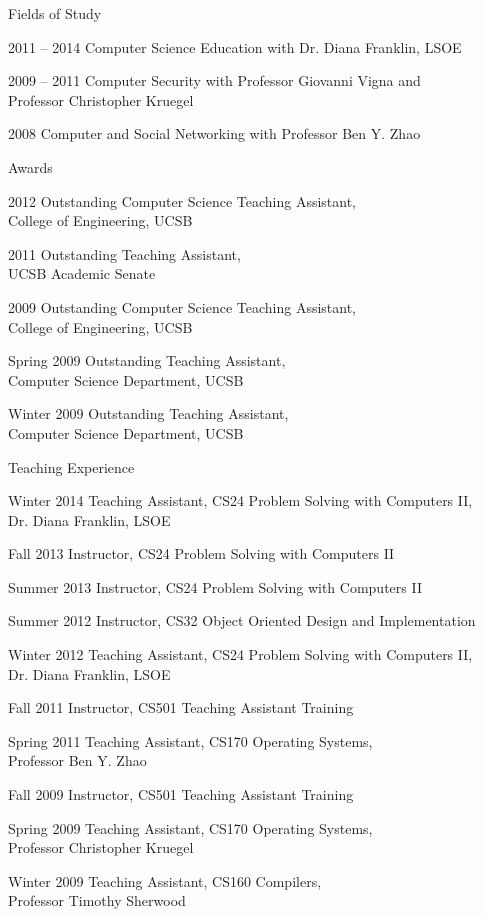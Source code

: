 \begin{vitae}
{\begin{vitaesection}{Fields of Study}
  \item [2011 -- 2014] Computer Science Education with Dr. Diana Franklin, LSOE
  \item [2009 -- 2011] Computer Security with Professor Giovanni Vigna
    and\\ Professor Christopher Kruegel
  \item [2008] Computer and Social Networking with Professor Ben Y. Zhao
\end{vitaesection}

\begin{vitaesection}{Awards}
  \item [2012] Outstanding Computer Science Teaching Assistant,\\ College of
    Engineering, UCSB
  \item [2011] Outstanding Teaching Assistant,\\ UCSB Academic Senate
  \item [2009] Outstanding Computer Science Teaching Assistant,\\ College of
    Engineering, UCSB
  \item [Spring 2009] Outstanding Teaching Assistant,\\ Computer Science
    Department, UCSB
  \item [Winter 2009] Outstanding Teaching Assistant,\\ Computer Science
    Department, UCSB
\end{vitaesection}

\begin{vitaesection}{Teaching Experience}
  \item [Winter 2014] Teaching Assistant, CS24 Problem Solving with Computers
    II,\\ Dr. Diana Franklin, LSOE
  \item [Fall 2013] Instructor, CS24 Problem Solving with Computers II
  \item [Summer 2013] Instructor, CS24 Problem Solving with Computers II
  \item [Summer 2012] Instructor, CS32 Object Oriented Design and
    Implementation
  \item [Winter 2012] Teaching Assistant, CS24 Problem Solving with Computers
    II,\\ Dr. Diana Franklin, LSOE
  \item [Fall 2011] Instructor, CS501 Teaching Assistant Training
  \item [Spring 2011] Teaching Assistant, CS170 Operating Systems,\\ Professor
    Ben Y. Zhao
  \item [Fall 2009] Instructor, CS501 Teaching Assistant Training
  \item [Spring 2009] Teaching Assistant, CS170 Operating Systems,\\ Professor
    Christopher Kruegel
  \item [Winter 2009] Teaching Assistant, CS160 Compilers,\\ Professor Timothy
    Sherwood
\end{vitaesection}

}
\end{vitae}
